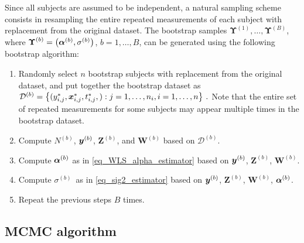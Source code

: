 \documentclass[letterpaper,10pt,openany]{article}
\def\W{\mathbf{W}}\def\w{\mathbf{w}}\def\Wv{\boldsymbol{W}}\def\wv{\boldsymbol{w}}
\def\Z{\mathbf{Z}}\def\z{\mathbf{z}}\def\Zv{\boldsymbol{Z}}\def\zv{\boldsymbol{z}}
\def\sig{\sigma}\def\sigv{\boldsymbol{\sigma}}
\def\Upsv{\boldsymbol{\Upsilon}}
\begin{document}
Since all subjects are assumed to be independent, a natural sampling scheme consists in resampling the entire repeated measurements of each subject with replacement from the original dataset. The bootstrap samples $\Upsv^{(1)},\ldots,\Upsv^{(B)}$, where $\Upsv^{(b)} = \left( \alv^{(b)},\sig^{(b)} \right)$, $b = 1,\ldots,B$, can be generated using the following bootstrap algorithm:
\begin{enumerate}[1.]
	\item Randomly select $n$ bootstrap subjects with replacement from the original dataset, and put together the bootstrap dataset as $\mathcal{D}^{(b)} = \left\{(y^*_{i,j}, \boldsymbol{x}^*_{i,j}, t^*_{i,j}, ) : j=1,\ldots,n_i, i=1,\ldots,n\right\}\,.$
	Note that the entire set of repeated measurements for some subjects may appear multiple times in the bootstrap dataset.
	\item Compute $N^{(b)}$, $\boldsymbol{y}^{(b)}$, $\Z^{(b)}$, and $\W^{(b)}$ based on $\mathcal{D}^{(b)}$.
	\item Compute $\boldsymbol{\alpha}^{(b)}$   as in \eqref{eq_WLS_alpha_estimator} based on $\boldsymbol{y}^{(b)}$, $\Z^{(b)}$, $\W^{(b)}$.
	\item Compute $\sigma^{(b)}$ \,as in \eqref{eq_sig2_estimator}    based on $\boldsymbol{y}^{(b)}$, $\Z^{(b)}$, $\W^{(b)}$, $\boldsymbol{\alpha}^{(b)}$.
	\item Repeat the previous steps $B$	times.
\end{enumerate}


\subsection{MCMC algorithm}\label{app_mcmc} 
\end{document}
